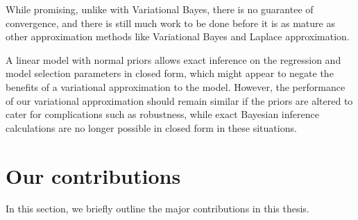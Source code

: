 While promising, unlike
with Variational Bayes, there is no guarantee of convergence, and there is still
much work to be done before it is as mature as other approximation methods like
Variational Bayes and Laplace approximation.

A linear model with normal priors allows exact inference on the regression and
model selection parameters in closed form, which might appear to negate the
benefits of a variational approximation to the model. However, the performance
of our variational approximation should remain similar if the priors are
altered to cater for complications such as robustness, while exact Bayesian
inference calculations are no longer possible in closed form in these
situations.


\section{Our contributions}

\noindent 
In this section, we briefly outline the major contributions in this thesis.

